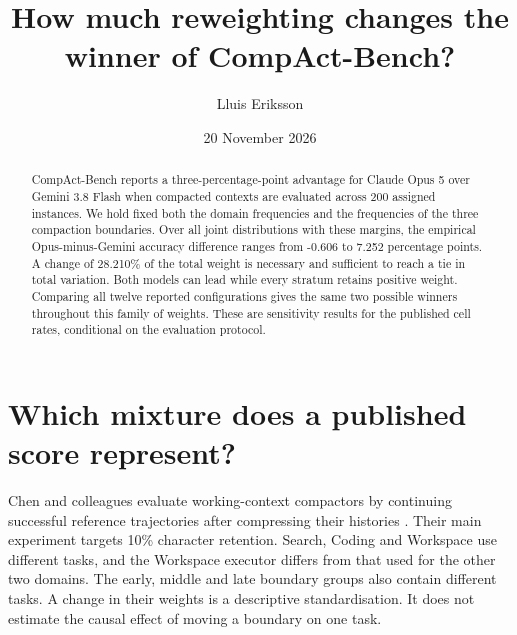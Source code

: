 \documentclass[11pt]{article}
\title{How much reweighting changes the winner of CompAct-Bench?}
\author{Lluis Eriksson}\date{20 November 2026}
\begin{document}
\maketitle
\begin{abstract}
CompAct-Bench reports a three-percentage-point advantage for Claude Opus 5 over Gemini 3.8 Flash when compacted contexts are evaluated across 200 assigned instances. We hold fixed both the domain frequencies and the frequencies of the three compaction boundaries. Over all joint distributions with these margins, the empirical Opus-minus-Gemini accuracy difference ranges from -0.606 to 7.252 percentage points. A change of 28.210\% of the total weight is necessary and sufficient to reach a tie in total variation. Both models can lead while every stratum retains positive weight. Comparing all twelve reported configurations gives the same two possible winners throughout this family of weights. These are sensitivity results for the published cell rates, conditional on the evaluation protocol.
\end{abstract}

\section{Which mixture does a published score represent?}
Chen and colleagues evaluate working-context compactors by continuing successful reference trajectories after compressing their histories \cite{chen}. Their main experiment targets 10\% character retention. Search, Coding and Workspace use different tasks, and the Workspace executor differs from that used for the other two domains. The early, middle and late boundary groups also contain different tasks. A change in their weights is a descriptive standardisation. It does not estimate the causal effect of moving a boundary on one task.
\end{document}
